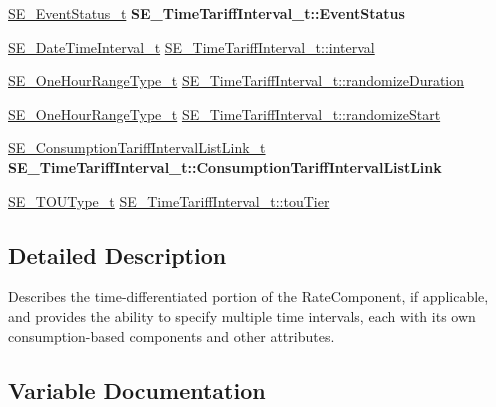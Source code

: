 \begin{DoxyCompactItemize}
\hyperlink{structSE__EventStatus__t}{S\+E\+\_\+\+Event\+Status\+\_\+t} {\bfseries S\+E\+\_\+\+Time\+Tariff\+Interval\+\_\+t\+::\+Event\+Status}
\item 
\hyperlink{structSE__DateTimeInterval__t}{S\+E\+\_\+\+Date\+Time\+Interval\+\_\+t} \hyperlink{group__TimeTariffInterval_gacacbb719e46c0307212fa42b1401b0bb}{S\+E\+\_\+\+Time\+Tariff\+Interval\+\_\+t\+::interval}
\item 
\hyperlink{group__OneHourRangeType_ga2b9c57435b20a5fc0689922b77e97c2d}{S\+E\+\_\+\+One\+Hour\+Range\+Type\+\_\+t} \hyperlink{group__TimeTariffInterval_ga81fde071a84cf7021224cb01e53c8c75}{S\+E\+\_\+\+Time\+Tariff\+Interval\+\_\+t\+::randomize\+Duration}
\item 
\hyperlink{group__OneHourRangeType_ga2b9c57435b20a5fc0689922b77e97c2d}{S\+E\+\_\+\+One\+Hour\+Range\+Type\+\_\+t} \hyperlink{group__TimeTariffInterval_ga695517ae5552ce104273d78c0361a76f}{S\+E\+\_\+\+Time\+Tariff\+Interval\+\_\+t\+::randomize\+Start}
\item 
\mbox{\label{group__TimeTariffInterval_ga30b5d453c950bf1975e190d442cc6d8d}} 
\hyperlink{structSE__ConsumptionTariffIntervalListLink__t}{S\+E\+\_\+\+Consumption\+Tariff\+Interval\+List\+Link\+\_\+t} {\bfseries S\+E\+\_\+\+Time\+Tariff\+Interval\+\_\+t\+::\+Consumption\+Tariff\+Interval\+List\+Link}
\item 
\hyperlink{group__TOUType_gadcfd871f87df34ae8228b9484ebedc6a}{S\+E\+\_\+\+T\+O\+U\+Type\+\_\+t} \hyperlink{group__TimeTariffInterval_gae1b2230df627613ae18186df2fc8f21d}{S\+E\+\_\+\+Time\+Tariff\+Interval\+\_\+t\+::tou\+Tier}
\end{DoxyCompactItemize}


\subsection{Detailed Description}
Describes the time-\/differentiated portion of the Rate\+Component, if applicable, and provides the ability to specify multiple time intervals, each with its own consumption-\/based components and other attributes. 

\subsection{Variable Documentation}
\mbox{\label{group__TimeTariffInterval_ga7b1863546f7a8bbfb0967abf77ab16be}} 
